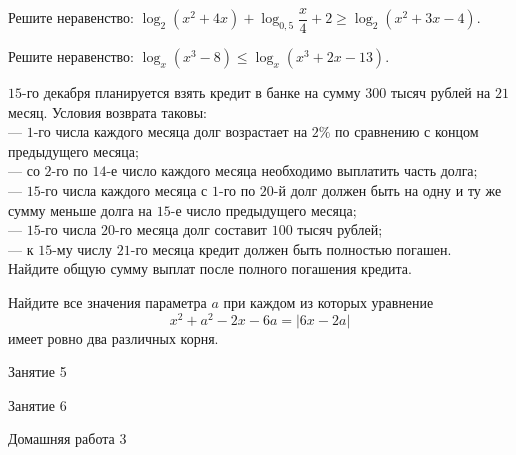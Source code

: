 \begin{homework}[number=2]
\begin{listofex}
\begin{tasks}
		\end{tasks}
		\item Решите неравенство: \( \log_2(x^2+4x)+\log_{0,5}\dfrac{x}{4}+2\ge\log_2(x^2+3x-4)\).
		\item Решите неравенство: \( \log_x(x^3-8)\le\log_x(x^3+2x-13) \).
		\item \( 15 \)-го декабря планируется взять кредит в банке на сумму \( 300 \) тысяч рублей на \( 21 \) месяц. Условия возврата таковы:\\		
		--- \( 1 \)-го числа каждого месяца долг возрастает на \( 2\% \) по сравнению с концом предыдущего месяца;\\
		--- со \( 2 \)-го по \( 14 \)-е число каждого месяца необходимо выплатить часть долга;\\
		--- \( 15 \)-го числа каждого месяца с \( 1 \)-го по \( 20 \)-й долг должен быть на одну и ту же сумму меньше долга на \( 15 \)-е число предыдущего месяца;\\		
		--- \( 15 \)-го числа \( 20 \)-го месяца долг составит \( 100 \) тысяч рублей;\\
		--- к \( 15 \)-му числу \( 21 \)-го месяца кредит должен быть полностью погашен.\\
		Найдите общую сумму выплат после полного погашения кредита.
		\item Найдите все значения параметра \( a \) при каждом из которых уравнение
		\[x^2+a^2-2x-6a=|6x-2a|\]
		имеет ровно два различных корня.
	\end{listofex}
\end{homework}

\begin{class}[number=5]
	\begin{listofex}
		\item Занятие 5
	\end{listofex}
\end{class}

\begin{class}[number=6]
	\begin{listofex}
		\item Занятие 6
	\end{listofex}
\end{class}

\begin{homework}[number=3]
	\begin{listofex}
		\item Домашняя работа 3
	\end{listofex}
\end{homework}

